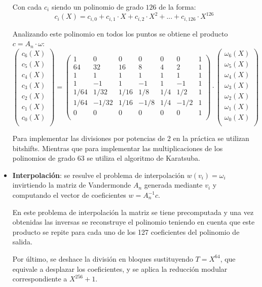 \begin{itemize}
	Con cada \(c_i\) siendo un polinomio de grado \(126\) de la forma:
	\begin{equation}
		c_i(X)=c_{i,0}+c_{i,1}\cdot X+c_{i,2}\cdot X^2 + ... + c_{i,126}\cdot X^{126}
	\end{equation}
	
	Analizando este polinomio en todos los puntos se obtiene el producto \(c= A_n \cdot \omega\):
	\begin{equation}
		\begin{pmatrix}
			c_6(X)\\
			c_5(X)\\
			c_4(X)\\
			c_3(X)\\
			c_2(X)\\
			c_1(X)\\
			c_0(X)\\
		\end{pmatrix}=
		\begin{pmatrix}
		1 & 0 & 0 &0 &0 &0&1\\
		64 & 32 & 16 &8 &4 &2&1\\
		1&1    &1    &1  & 1 &1 &1\\
		1&  -1  &  1  &-1 &  1&-1 &1\\
		1/64&  1/32  & 1/16   &  1/8& 1/4 &1/2 &1\\
		1/64&  -1/32  & 1/16   &  -1/8& 1/4 &-1/2 &1\\
		0& 0   &    0&  0& 0 &0 &1\\
		\end{pmatrix}\cdot
		\begin{pmatrix}
			\omega_6(X)\\
			\omega_5(X)\\
			\omega_4(X)\\
			\omega_3(X)\\
			\omega_2(X)\\
			\omega_1(X)\\
			\omega_0(X)\\
		\end{pmatrix}
	\end{equation}

	Para implementar las divisiones por potencias de \(2\) en la práctica se utilizan bitshifts. Mientras que para implementar las multiplicaciones de los polinomios de grado 63 se utiliza el algoritmo de Karatsuba.
	\item \textbf{Interpolación}: se resulve el problema de interpolación \(w(v_i)=\omega_i\) invirtiendo la matriz de Vandermonde \(A_n\) generada mediante \(v_i\) y computando el vector de coeficientes \(w=A_n^{-1}c\). 
	\newline
	
	En este problema de interpolación la matriz se tiene precomputada y una vez obtenidas las inversas se reconstruye el polinomio teniendo en cuenta que este producto se repite para cada uno de los 127 coeficientes del polinomio de salida.
	\newline
	
	Por último, se deshace la división en bloques sustituyendo $T=X^{64}$, que equivale a desplazar los coeficientes, y se aplica la reducción modular correspondiente a $X^{256} + 1$.
\end{itemize}


